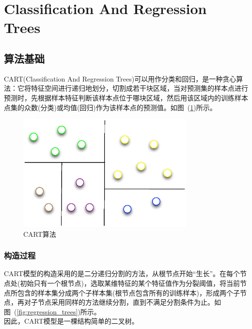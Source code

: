 \documentclass[a4paper,11pt,         %
               ]{article}
\begin{document}
\newpage


\section{Classification And Regression Trees}

\subsection{算法基础}

CART(Classification And Regression Trees)可以用作分类和回归，是一种贪心算法：它将特征空间进行递归地划分，切割成若干块区域，当对预测集的样本点进行预测时，先根据样本特征判断该样本点位于哪块区域，然后用该区域内的训练样本点集的众数(分类)或均值(回归)作为该样本点的预测值。如图~(\ref{fig:cart_cut})所示。

\begin{figure}[htbp]
\centering\includegraphics[width=3.5in]{img/cart_cut.eps}
\caption{CART算法}\label{fig:cart_cut}
\end{figure}

\subsubsection{构造过程}

CART模型的构造采用的是二分递归分割的方法，从根节点开始“生长”。在每个节点处(初始只有一个根节点)，选取某维特征的某个特征值作为分裂阈值，将当前节点所包含的样本集分成两个子样本集(根节点包含所有的训练样本)，形成两个子节点，再对子节点采用同样的方法继续分割，直到不满足分割条件为止。如图~(\ref{fig:regression_trees})所示。 \\

因此，CART模型是一棵结构简单的二叉树。 
\end{document}
